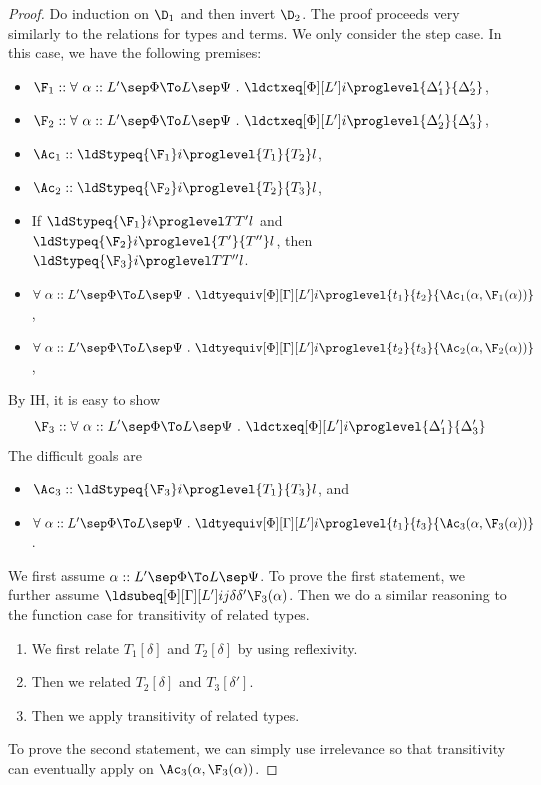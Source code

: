 \begin{proof}
  Do induction on $\D_1$ and then invert $\D_2$. %
  The proof proceeds very similarly to the relations for types and terms. %
  We only consider the step case. %
  In this case, we have the following premises:
  \begin{itemize}
  \item $\F_1 :: \forall~\alpha :: L' \sep \Phi \To L \sep \Psi ~.~
    \ldctxeq[\Phi][L'] i \proglevel {\Delta_1'}{\Delta_2'}$,
  \item $\F_2 :: \forall~\alpha :: L' \sep \Phi \To L \sep \Psi ~.~
    \ldctxeq[\Phi][L'] i \proglevel {\Delta_2'}{\Delta_3'}$,
  \item $\Ac_1 :: \ldStypeq{\F_1} i \proglevel {T_1}{T_2} l$,
  \item $\Ac_2 :: \ldStypeq{\F_2} i \proglevel{T_2}{T_3} l$,
  \item If $\ldStypeq{\F_1} i \proglevel T{T'} l$ and $\ldStypeq{\F_2} i \proglevel{T'}{T''} l$, then
    $\ldStypeq {\F_3} i \proglevel T{T''} l$.
  \item
    $\forall~\alpha :: L' \sep \Phi \To L \sep \Psi ~.~ \ldtyequiv[\Phi][\Gamma][L']
    i \proglevel {t_1}{t_2}{\Ac_1(\alpha, \F_1(\alpha))}$,
  \item
    $\forall~\alpha :: L' \sep \Phi \To L \sep \Psi ~.~ \ldtyequiv[\Phi][\Gamma][L']
    i \proglevel {t_2}{t_3}{\Ac_2(\alpha, \F_2(\alpha))}$,
  \end{itemize}
  By IH, it is easy to show
  \[
    \F_3 :: \forall~\alpha :: L' \sep \Phi \To L \sep \Psi ~.~
    \ldctxeq[\Phi][L'] i \proglevel {\Delta_1'}{\Delta_3'}
  \]
  The difficult goals are
  \begin{itemize}
  \item $\Ac_3 :: \ldStypeq{\F_3} i \proglevel{T_1}{T_3} l$, and
  \item
    $\forall~\alpha :: L' \sep \Phi \To L \sep \Psi ~.~ \ldtyequiv[\Phi][\Gamma][L']
    i \proglevel {t_1}{t_3}{\Ac_3(\alpha, \F_3(\alpha))}$. 
  \end{itemize}
  We first assume $\alpha :: L' \sep \Phi \To L \sep \Psi$. %
  To prove the first statement, we further assume $\ldsubeq[\Phi][\Gamma][L'] i j
  \delta{\delta'}{\F_3(\alpha)}$. %
  Then we do a similar reasoning to the function case for transitivity of related
  types. %
  \begin{enumerate}
  \item We first relate $T_1[\delta]$ and $T_2[\delta]$ by using reflexivity.
  \item Then we related $T_2[\delta]$ and $T_3[\delta']$.
  \item Then we apply transitivity of related types. 
  \end{enumerate}

  To prove the second statement, we can simply use irrelevance so that transitivity
  can eventually apply on $\Ac_3(\alpha, \F_3(\alpha))$. 
\end{proof}

